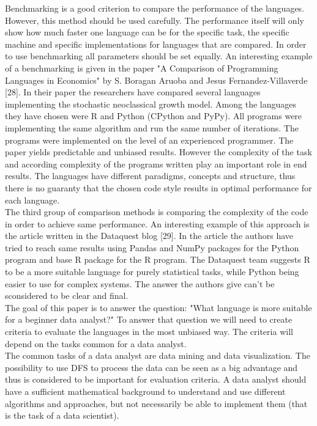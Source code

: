 \documentclass[
  twoside,
  11pt, a4paper,
  footinclude=true,
  headinclude=true,
  cleardoublepage=empty
]{scrreprt}
\begin{document}
        Benchmarking is a good criterion to compare the performance of the languages. However, this method should be used carefully. The performance itself will only show how much faster one language can be for the specific task, the specific machine and specific implementations for languages that are compared. In order to use benchmarking all parameters should be set equally. An interesting example of a benchmarking is given in the paper "A Comparison of Programming Languages in Economics" by S. Boragan Aruoba and Jesus Fernandez-Villaverde [28]. In their paper the researchers have compared several languages implementing the stochastic neoclassical growth model. Among the languages they have chosen were R and Python (CPython and PyPy). All programs were implementing the same algorithm and run the same number of iterations. The programs were implemented on the level of an experienced programmer. The paper yields predictable and unbiased results. However the complexity of the task and according complexity of the programs written play an important role in end results. The languages have different paradigms, concepts and structure, thus there is no guaranty that the chosen code style results in optimal performance for each language.\\
        The third group of comparison methods is comparing the complexity of the code in order to achieve same performance. An interesting example of this approach is the article written in the Dataquest blog [29]. In the article the authors have tried to reach same results using Pandas and NumPy packages for the Python program and base R package for the R program. The Dataquest team suggests R to be a more suitable language for purely statistical tasks, while Python being easier to use for complex systems. The answer the authors give can't be sconsidered to be clear and final.\\
        The goal of this paper is to answer the question: "What language is more suitable for a beginner data analyst?" To answer that question we will need to create criteria to evaluate the languages in the most unbiased way. The criteria will depend on the tasks common for a data analyst.\\
        The common tasks of a data analyst are data mining and data visualization. The possibility to use DFS to process the data can be seen as a big advantage and thus is considered to be important for evaluation criteria. A data analyst should have a sufficient mathematical background to understand and use different algorithms and approaches, but not necessarily be able to implement them (that is the task of a data scientist).\\
    
\end{document}
